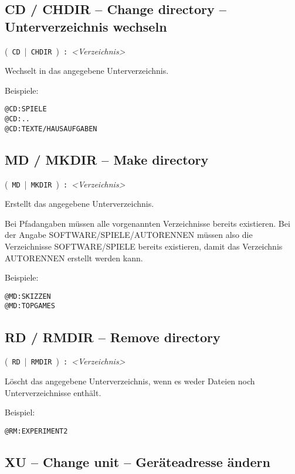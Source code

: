 \documentclass[10pt,a4paper]{scrartcl}		%
\begin{document}
\subsection{CD / CHDIR -- Change directory -- Unterverzeichnis wechseln}
\mbox{\Big( \texttt{CD} \Big| \texttt{CHDIR} \Big) 
\texttt{:} \textit{<Verzeichnis>}}

Wechselt in das angegebene Unterverzeichnis.

Beispiele:
\begin{verbatim}
@CD:SPIELE
@CD:..
@CD:TEXTE/HAUSAUFGABEN
\end{verbatim}

\subsection{MD / MKDIR -- Make directory}

\mbox{\Big( \texttt{MD} \Big| \texttt{MKDIR} \Big) 
\texttt{:} \textit{<Verzeichnis>}}

Erstellt das angegebene Unterverzeichnis. 

Bei Pfadangaben müssen
alle vorgenannten Verzeichnisse bereits existieren. Bei der
Angabe SOFTWARE/SPIELE/AUTORENNEN müssen also die Verzeichnisse
SOFTWARE/SPIELE bereits existieren, damit das Verzeichnis AUTORENNEN 
erstellt werden kann.

Beispiele:
\begin{verbatim}
@MD:SKIZZEN
@MD:TOPGAMES
\end{verbatim}



\subsection{RD / RMDIR -- Remove directory}

\mbox{\Big( \texttt{RD} \Big| \texttt{RMDIR} \Big) 
\texttt{:} \textit{<Verzeichnis>}}

Löscht das angegebene Unterverzeichnis, wenn es weder
Dateien noch Unterverzeichnisse enthält.

Beispiel:
\begin{verbatim}
@RM:EXPERIMENT2
\end{verbatim}




\subsection{XU -- Change unit -- Geräteadresse ändern}
\end{document}

